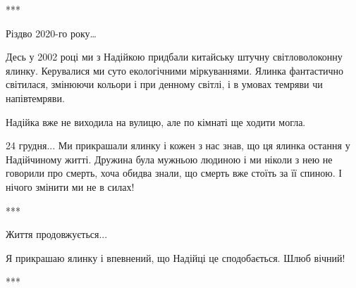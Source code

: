 ***

Різдво 2020-го року…

Десь у 2002 році ми з Надійкою придбали китайську штучну світловолоконну
ялинку. Керувалися ми суто екологічними міркуваннями. Ялинка фантастично
світилася, змінюючи кольори і при денному світлі, і в умовах темряви чи
напівтемряви. 

Надійка вже не виходила на вулицю, але по кімнаті ще ходити могла. 

24 грудня... Ми прикрашали ялинку і кожен з нас знав, що ця ялинка остання у
Надійчиному житті. Дружина була мужньою людиною і ми ніколи з нею не говорили
про смерть, хоча обидва знали, що смерть вже стоїть за її спиною. І нічого
змінити ми не в силах!

***

Життя продовжується... 

Я прикрашаю ялинку і впевнений, що Надійці це сподобається. Шлюб вічний!

***
